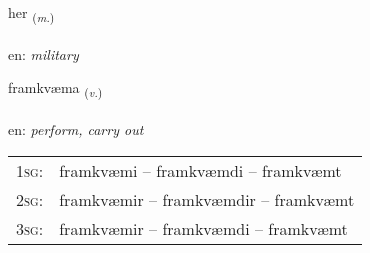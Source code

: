 \documentclass[frontgrid, backgrid]{flacards}\usepackage[]{graphicx}\usepackage[]{color}
\begin{document}
\renewcommand{\flhead}{\vskip5pt \fboxsep=0pt {\small\bfseries\footnotesize Nafnorð | Noun}}
\renewcommand{\fcfoot}{\vskip5pt \fboxsep=0pt \hspace{2pt}{\small\bfseries\footnotesize 2K}}

\renewcommand{\blhead}{\vskip5pt {\small\bfseries\footnotesize Nafnorð | Noun }}
\renewcommand{\bcfoot}{\vskip5pt \hspace{2pt}{\small\bfseries\footnotesize 2K}}


{her \small{\textsubscript{(\textit{m.})}} \\[1ex] %
\textphonetic{[hɛːr]} \\
en: \emph{military} \\  [2ex]
\renewcommand*{\arraystretch}{0.8}
}

\renewcommand{\flhead}{\vskip5pt \fboxsep=0pt {\small\bfseries\footnotesize Sagnorð | Verb}}
\renewcommand{\fcfoot}{\vskip5pt \fboxsep=0pt \hspace{2pt}{\small\bfseries\footnotesize 2K}}

\renewcommand{\blhead}{\vskip5pt {\small\bfseries\footnotesize Sagnorð | Verb }}
\renewcommand{\bcfoot}{\vskip5pt \hspace{2pt}{\small\bfseries\footnotesize 2K}}


{framkvæma \small{\textsubscript{(\textit{v.})}} \\[1ex] %
\textphonetic{[framkʰvaima]} \\
en: \emph{perform, carry out} \\  [2ex]
\renewcommand*{\arraystretch}{0.8}
\begin{tabular}{p{1cm}l}
\textsc{1sg}: & framkvæmi -- framkvæmdi -- framkvæmt \\ 
\textsc{2sg}: & framkvæmir -- framkvæmdir -- framkvæmt \\ 
\textsc{3sg}: & framkvæmir -- framkvæmdi -- framkvæmt \\ 
\end{tabular}
}
\end{document}
